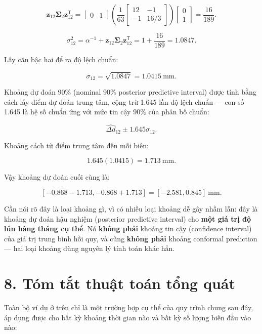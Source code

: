 \documentclass[12pt]{article}
\begin{document}
\[
\boldsymbol{z}_{12}
\boldsymbol{\Sigma}_2
\boldsymbol{z}_{12}^{\mathsf{T}}
=
\begin{bmatrix}
0 & 1
\end{bmatrix}
\left(
\frac{1}{63}
\begin{bmatrix}
12 & -1\\
-1 & 16/3
\end{bmatrix}
\right)
\begin{bmatrix}
0\\
1
\end{bmatrix}
=
\frac{16}{189}.
\]

\[
\sigma_{12}^{2}
=
\alpha^{-1}
+
\boldsymbol{z}_{12}
\boldsymbol{\Sigma}_2
\boldsymbol{z}_{12}^{\mathsf{T}}
=
1+
\frac{16}{189}
=
1.0847.
\]

Lấy căn bậc hai để ra độ lệch chuẩn:

\[
\sigma_{12}
=
\sqrt{1.0847}
=
1.0415\ \mathrm{mm}.
\]

Khoảng dự đoán 90\% (nominal 90\% posterior predictive interval) được tính bằng cách lấy điểm dự đoán trung tâm, cộng trừ 1.645 lần độ lệch chuẩn — con số 1.645 là hệ số chuẩn ứng với mức tin cậy 90\% của phân bố chuẩn:

\[
\widehat{\Delta d}_{12}
\pm
1.645\sigma_{12}.
\]

Khoảng cách từ điểm trung tâm đến mỗi biên:

\[
1.645(1.0415)
=
1.713\ \mathrm{mm}.
\]

Vậy khoảng dự đoán cuối cùng là:

\[
\left[
-0.868-1.713,
-0.868+1.713
\right]
=
\left[
-2.581,
0.845
\right]\ \mathrm{mm}.
\]

Cần nói rõ đây là loại khoảng gì, vì có nhiều loại khoảng dễ gây nhầm lẫn: đây là khoảng dự đoán hậu nghiệm (posterior predictive interval) cho \textbf{một giá trị độ lún hàng tháng cụ thể}. Nó \textbf{không phải} khoảng tin cậy (confidence interval) của giá trị trung bình hồi quy, và cũng \textbf{không phải} khoảng conformal prediction — hai loại khoảng dùng nguyên lý tính toán khác hẳn.

\section{8. Tóm tắt thuật toán tổng quát}

Toàn bộ ví dụ ở trên chỉ là một trường hợp cụ thể của quy trình chung sau đây, áp dụng được cho bất kỳ khoảng thời gian nào và bất kỳ số lượng biến đầu vào nào:
\end{document}
